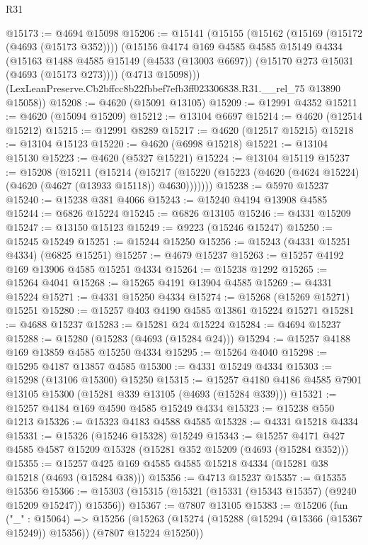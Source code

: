 \begin{lexlean}{R31}
\begin{coremodule}
@15173 := @4694 @15098
@15206 := @15141
    (@15155
      (@15162
        (@15169 (@15172 (@4693 (@15173 @352))))
        (@15156
          @4174
          @169
          @4585
          @4585
          @15149
          @4334
          (@15163
            @1488
            @4585
            @15149
            (@4533 (@13003 @6697))
            (@15170 @273 @15031 (@4693 (@15173 @273))))
          (@4713 @15098)))
      (LexLeanPreserve.Cb2bffcc8b22fbbef7efb3ff023306838.R31.__rel_75 @13890 @15058))
@15208 := @4620 (@15091 @13105)
@15209 := @12991 @4352
@15211 := @4620 (@15094 @15209)
@15212 := @13104 @6697
@15214 := @4620 (@12514 @15212)
@15215 := @12991 @8289
@15217 := @4620 (@12517 @15215)
@15218 := @13104 @15123
@15220 := @4620 (@6998 @15218)
@15221 := @13104 @15130
@15223 := @4620 (@5327 @15221)
@15224 := @13104 @15119
@15237 := @15208
    (@15211
      (@15214
        (@15217 (@15220 (@15223 (@4620 (@4624 @15224) (@4620 (@4627 (@13933 @15118)) @4630)))))))
@15238 := @5970 @15237
@15240 := @15238 @381 @4066
@15243 := @15240 @4194 @13908 @4585
@15244 := @6826 @15224
@15245 := @6826 @13105
@15246 := @4331 @15209
@15247 := @13150 @15123
@15249 := @9223 (@15246 @15247)
@15250 := @15245 @15249
@15251 := @15244 @15250
@15256 := @15243 (@4331 @15251 @4334) (@6825 @15251)
@15257 := @4679 @15237
@15263 := @15257 @4192 @169 @13906 @4585 @15251 @4334
@15264 := @15238 @1292
@15265 := @15264 @4041
@15268 := @15265 @4191 @13904 @4585
@15269 := @4331 @15224
@15271 := @4331 @15250 @4334
@15274 := @15268 (@15269 @15271) @15251
@15280 := @15257 @403 @4190 @4585 @13861 @15224 @15271
@15281 := @4688 @15237
@15283 := @15281 @24 @15224
@15284 := @4694 @15237
@15288 := @15280 (@15283 (@4693 (@15284 @24)))
@15294 := @15257 @4188 @169 @13859 @4585 @15250 @4334
@15295 := @15264 @4040
@15298 := @15295 @4187 @13857 @4585
@15300 := @4331 @15249 @4334
@15303 := @15298 (@13106 @15300) @15250
@15315 := @15257 @4180 @4186 @4585 @7901 @13105 @15300 (@15281 @339 @13105 (@4693 (@15284 @339)))
@15321 := @15257 @4184 @169 @4590 @4585 @15249 @4334
@15323 := @15238 @550 @1213
@15326 := @15323 @4183 @4588 @4585
@15328 := @4331 @15218 @4334
@15331 := @15326 (@15246 @15328) @15249
@15343 := @15257 @4171 @427 @4585 @4587 @15209 @15328 (@15281 @352 @15209 (@4693 (@15284 @352)))
@15355 := @15257 @425 @169 @4585 @4585 @15218 @4334 (@15281 @38 @15218 (@4693 (@15284 @38)))
@15356 := @4713 @15237
@15357 := @15355 @15356
@15366 := @15303 (@15315 (@15321 (@15331 (@15343 @15357) (@9240 @15209 @15247)) @15356))
@15367 := @7807 @13105
@15383 := @15206
    (fun ("_" : @15064) =>
    @15256
      (@15263
        (@15274 (@15288 (@15294 (@15366 (@15367 @15249)) @15356)) (@7807 @15224 @15250))

\end{coremodule}
\end{lexlean}

